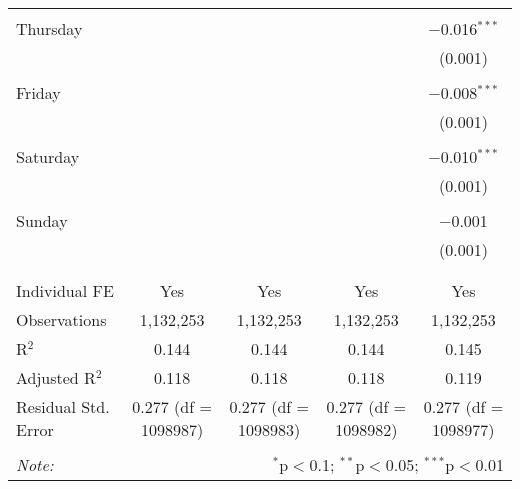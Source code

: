 \documentclass[
]{article}
\begin{document}
\begin{table}[!htbp]
{\begin{tabular}{@{\extracolsep{5pt}}lcccc}
  & & & & \\ 
 Thursday &  &  &  & $-$0.016$^{***}$ \\ 
  &  &  &  & (0.001) \\ 
  & & & & \\ 
 Friday &  &  &  & $-$0.008$^{***}$ \\ 
  &  &  &  & (0.001) \\ 
  & & & & \\ 
 Saturday &  &  &  & $-$0.010$^{***}$ \\ 
  &  &  &  & (0.001) \\ 
  & & & & \\ 
 Sunday &  &  &  & $-$0.001 \\ 
  &  &  &  & (0.001) \\ 
  & & & & \\ 
\hline \\[-1.8ex] 
Individual FE & Yes & Yes & Yes & Yes \\ 
Observations & 1,132,253 & 1,132,253 & 1,132,253 & 1,132,253 \\ 
R$^{2}$ & 0.144 & 0.144 & 0.144 & 0.145 \\ 
Adjusted R$^{2}$ & 0.118 & 0.118 & 0.118 & 0.119 \\ 
Residual Std. Error & 0.277 (df = 1098987) & 0.277 (df = 1098983) & 0.277 (df = 1098982) & 0.277 (df = 1098977) \\ 
\hline 
\hline \\[-1.8ex] 
\textit{Note:}  & \multicolumn{4}{r}{$^{*}$p$<$0.1; $^{**}$p$<$0.05; $^{***}$p$<$0.01} \\ 
\end{tabular}
} 
\end{table} 
\newpage
\end{document}

